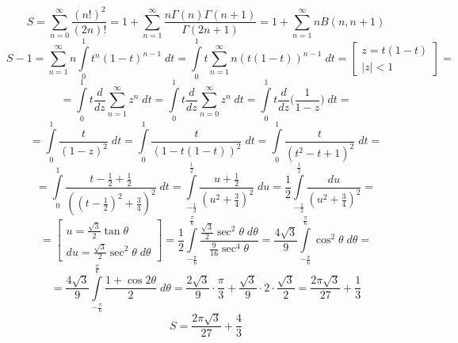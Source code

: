 


	$$S = \sum_{n = 0}^{\infty} \frac{ (n!)^2}{(2n)!} = 1 + \sum_{n = 1}^{\infty} \frac{n \Gamma(n) \Gamma(n+1)}{\Gamma(2n+1)} =1 + \sum_{n = 1}^{\infty} n B(n, n+1)$$
	$$S-1=   \sum_{n = 1}^{\infty} n \int \limits_0^1 t^{n} (1-t)^{n-1}\; dt = \int \limits_0^1 t \sum_{n = 1}^{\infty} n (t(1-t))^{n-1}\; dt =  \left[ \begin{array}{c} z = t(1-t) \\ |z|< 1 \end{array} \right] =$$
	$$=    \int \limits_0^1 t \frac{d}{dz}\sum_{n = 1}^{\infty} z^n\; dt =  \int \limits_0^1 t \frac{d}{dz}\sum_{n = 0}^{\infty} z^n\; dt = \int \limits_0^1 t \frac{d}{dz} \Bigg( \frac{1}{1-z}\Bigg) \; dt=$$
	$$= \int \limits_0^1 \frac{t}{(1-z)^2}  \; dt= \int \limits_0^1 \frac{t}{(1-t(1-t))^2}  \; dt =  \int \limits_0^1 \frac{t}{(t^2-t+1)^2}  \; dt =$$
	$$= \int \limits_0^1 \frac{t-\frac{1}{2}+\frac{1}{2}}{((t-\frac{1}{2})^2+\frac{3}{4})^2}  \; dt = \int \limits_{-\frac{1}{2}}^{\frac{1}{2}} \frac{u+\frac{1}{2}}{(u^2+\frac{3}{4})^2}  \; du = \frac{1}{2} \int \limits_{-\frac{1}{2}}^{\frac{1}{2}} \frac{du}{(u^2+\frac{3}{4})^2} = $$
	$$= \left[ \begin{array}{c} u = \frac{\sqrt{3}}{2} \tan \theta \\ du = \frac{\sqrt{3}}{2} \sec^2 \theta \; d\theta \end{array} \right] = \frac{1}{2} \int \limits_{-\frac{\pi}{6}}^{\frac{\pi}{6}} \frac{\frac{\sqrt{3}}{2} \sec^2 \theta \; d\theta}{\frac{9}{16} \sec^4 \theta} = \frac{4\sqrt{3}}{9} \int \limits_{-\frac{\pi}{6}}^{\frac{\pi}{6}} \cos^2 \theta \; d\theta =$$
	$$= \frac{4\sqrt{3}}{9} \int \limits_{-\frac{\pi}{6}}^{\frac{\pi}{6}} \frac{1+\cos 2\theta}{2} \; d\theta = \frac{2\sqrt{3}}{9} \cdot \frac{\pi}{3} + \frac{\sqrt{3}}{9} \cdot 2 \cdot \frac{\sqrt{3}}{2} = \frac{2\pi\sqrt{3}}{27}+\frac{1}{3}$$
	$$S = \frac{2\pi\sqrt{3}}{27}+\frac{4}{3}$$
	
